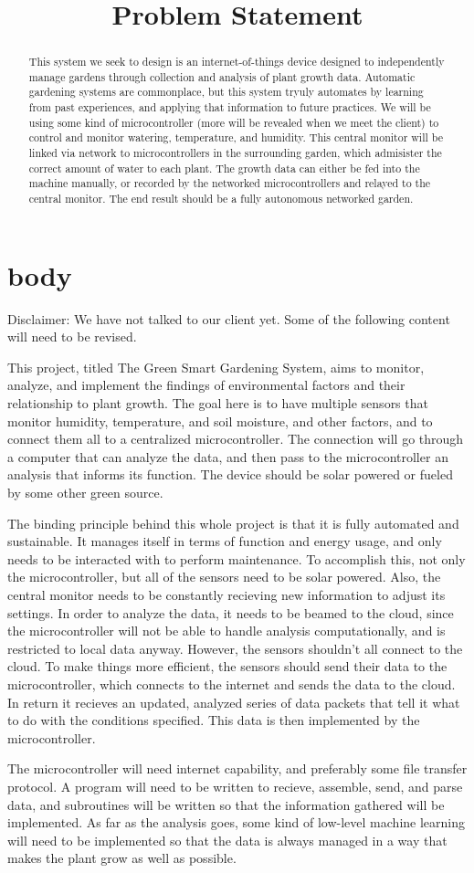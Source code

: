 \documentclass[letterpaper, 10pt, fleqn]{article}
\title{Problem Statement}
\begin{document}
\begin{abstract}
	This system we seek to design is an internet-of-things device designed to independently manage gardens through collection and analysis of plant growth data. Automatic gardening systems are commonplace, but this system tryuly automates by learning from past experiences, and applying that information to future practices. We will be using some kind of microcontroller (more will be revealed when we meet the client) to control and monitor watering, temperature, and humidity. This central monitor will be linked via network to microcontrollers in the surrounding garden, which admisister the correct amount of water to each plant. The growth data can either be fed into the machine manually, or recorded by the networked microcontrollers and relayed to the central monitor. The end result should be a fully autonomous networked garden. 
\end{abstract}

\section{body}
	Disclaimer: We have not talked to our client yet. Some of the following content will need to be revised. 

	This project, titled The Green Smart Gardening System, aims to monitor, analyze, and implement the findings of environmental factors and their relationship to plant growth. The goal here is to have multiple sensors that monitor humidity, temperature, and soil moisture, and other factors, and to connect them all to a centralized microcontroller. The connection will go through a computer that can analyze the data, and then pass to the microcontroller an analysis that informs its function. The device should be solar powered or fueled by some other green source. 

	The binding principle behind this whole project is that it is fully automated and sustainable. It manages itself in terms of function and energy usage, and only needs to be interacted with to perform maintenance. To accomplish this, not only the microcontroller, but all of the sensors need to be solar powered. Also, the central monitor needs to be constantly recieving new information to adjust its settings. In order to analyze the data, it needs to be beamed to the cloud, since the microcontroller will not be able to handle analysis computationally, and is restricted to local data anyway. However, the sensors shouldn't all connect to the cloud. To make things more efficient, the sensors should send their data to the microcontroller, which connects to the internet and sends the data to the cloud. In return it recieves an updated, analyzed series of data packets that tell it what to do with the conditions specified. This data is then implemented by the microcontroller. 

	The microcontroller will need internet capability, and preferably some file transfer protocol. A program will need to be written to recieve, assemble, send, and parse data, and subroutines will be written so that the information gathered will be implemented. As far as the analysis goes, some kind of low-level machine learning will need to be implemented so that the data is always managed in a way that makes the plant grow as well as possible. 
\end{document}
